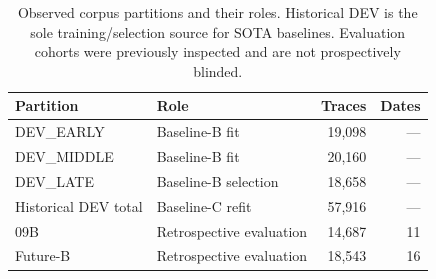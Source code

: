 \begin{table}[htbp]
\centering
\caption{Observed corpus partitions and their roles. Historical DEV is the sole training/selection source for SOTA baselines. Evaluation cohorts were previously inspected and are not prospectively blinded.}
\label{tab:datasets}
\begin{tabular}{llrr}
\toprule
Partition & Role & Traces & Dates \\
\midrule
DEV\_EARLY & Baseline-B fit & 19,098 & --- \\
DEV\_MIDDLE & Baseline-B fit & 20,160 & --- \\
DEV\_LATE & Baseline-B selection & 18,658 & --- \\
Historical DEV total & Baseline-C refit & 57,916 & --- \\
09B & Retrospective evaluation & 14,687 & 11 \\
Future-B & Retrospective evaluation & 18,543 & 16 \\
\bottomrule
\end{tabular}
\end{table}
